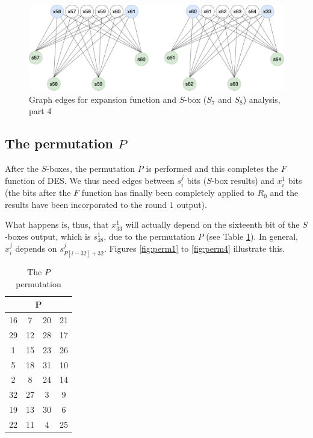 \documentclass{report}
\begin{document}
\begin{figure}[h!]
    \centering
    \includegraphics[scale=0.3]{Grafo_DES-expansion4.png}
    \caption{Graph edges for expansion function and $S$-box ($S_7$ and $S_8$) analysis, part 4}
    \label{fig:expansion4}
\end{figure}

\subsection{The permutation $P$}
After the $S$-boxes, the permutation $P$ is performed and this completes the $F$ function of DES. We thus need edges between $s_i^j$ bits ($S$-box results) and $x_i^1$ bits (the bits after the $F$ function has finally been completely applied to $R_0$ and the results have been incorporated to the round $1$ output).

What happens is, thus, that $x_{33}^1$ will actually depend on the sixteenth bit of the $S$-boxes output, which is $s_{48}^1$, due to the permutation $P$ (see Table \ref{tab:des-p}). In general, $x_i^j$ depends on $s_{P[i-32]+32}^j$. Figures \ref{fig:perm1} to \ref{fig:perm4} illustrate this.

\begin{table}[h!]
\centering
\begin{tabular}{|c|c|c|c|}
\hline
\multicolumn{4}{|c|}{P} \\ \hline
16   & 7    & 20  & 21  \\ \hline
29   & 12   & 28  & 17  \\ \hline
1    & 15   & 23  & 26  \\ \hline
5    & 18   & 31  & 10  \\ \hline
2    & 8    & 24  & 14  \\ \hline
32   & 27   & 3   & 9   \\ \hline
19   & 13   & 30  & 6   \\ \hline
22   & 11   & 4   & 25  \\ \hline
\end{tabular}
\caption{The $P$ permutation}
\label{tab:des-p}
\end{table}
\end{document}
